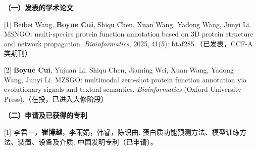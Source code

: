 
\begin{publication}
  \noindent\songti\textbf{（一）发表的学术论文}

  [1] Beibei Wang, \textbf{Boyue Cui}, Shiqu Chen, Xuan Wang, Yadong Wang, Junyi Li. MSNGO: multi-species protein function annotation based on 3D protein structure and network propagation. \textit{Bioinformatics}, 2025, 41(5): btaf285.（已发表，CCF-A类期刊）

  [2] \textbf{Boyue Cui}, Yujuan Li, Shiqu Chen, Jiaming Wei, Xuan Wang, Yadong Wang, Junyi Li. MZSGO: multimodal zero-shot protein function annotation via evolutionary signals and textual semantics. \textit{Bioinformatics} (Oxford University Press).（在投，已进入大修阶段）

  \noindent\songti\textbf{（二）申请及已获得的专利}

  [1] 李君一，\textbf{崔博越}，李雨娟，韩睿，陈识曲. 蛋白质功能预测方法、模型训练方法、装置、设备及介质. 中国发明专利（已申请）。

\end{publication}
